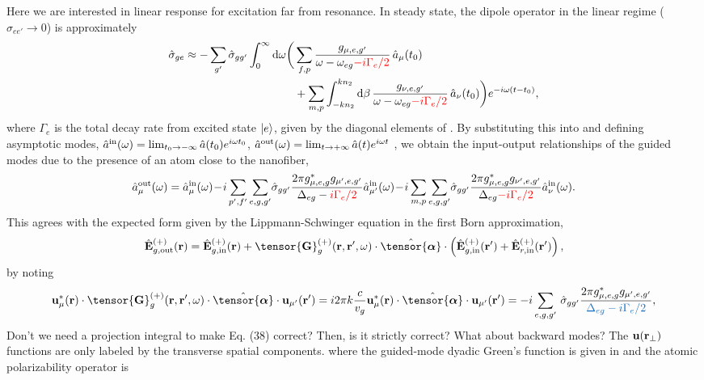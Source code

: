\documentclass[preprint,aps,pra,onecolumn]{revtex4-1} %
\newcommand{\inp}{{\rm in}}
\newcommand{\out}{{\rm out}}
\newcommand{\poltens}{\hat{\tensor{\boldsymbol{\alpha}}}}
\newcommand{\change}[1]{{\color{RoyalBlue} #1}}
\newcommand{\comment}[1]{{\color{Maroon} #1}}
\newcommand{\error}[1]{{\color{red} #1}}
\begin{document}
Here we are interested in linear response for excitation far from resonance.  In steady state, the dipole 
operator in the linear regime ($\hat{\sigma}_{ee'} \rightarrow 0 $) is approximately
\begin{align}
\hat{\sigma}_{ge} \approx -\sum_{g'} \hat{\sigma}_{gg'}\int_0^{\infty}\mathrm{d}\omega \bigg( & \sum_{f,p}  
\frac{g_{\mu, e,g'}}{\omega-\omega_{eg} \error{- i \Gamma_{e}/2 } }\, \hat{a}_\mu (t_0) \\
	&+\sum_{m,p} \int_{-kn_2}^{kn_2}\mathrm{d}\beta \, \frac{g_{\nu, e,g'}}{\omega-\omega_{eg}\error{- i \Gamma_{e}/2 }} \,\hat{a}_\nu (t_0)  \bigg)e^{-i\omega (t-t_0)} , \nn
\end{align}
where $\Gamma_e$ is the total decay rate from excited state $\lvert{e}\rangle$, given by the diagonal elements of .  By substituting this into  and defining asymptotic modes, \comment{ $\hat{a}^{\inp}(\omega) = \lim_{t_0\rightarrow -\infty} \hat{a}(t_0) e^{i\omega t_0}$, $\hat{a}^{\out}(\omega) = \lim_{t\rightarrow +\infty} \hat{a}(t) e^{i\omega t}$ \cite{fan_input-output_2010} }, we obtain the input-output relationships of the guided modes due to the presence of an atom close to the nanofiber,
\begin{equation}
\hat{a}^{\out}_\mu (\omega) = \hat{a}^{\inp}_\mu (\omega) \!-\! i\sum_{p',f'} 
\sum_{e,g,g'}\!\hat{\sigma}_{gg'}\frac{2\pi g_{\mu,e,g}^* 
g_{\mu',e,g'}}{ \Delta_{eg} -  \error{i \Gamma_{e}/2 }}\hat{a}^{\inp}_{\mu'}(\omega) \!-\! i\sum_{m,p} 
\sum_{e,g,g'}\!\hat{\sigma}_{gg'}\frac{2\pi  g_{\mu,e,g}^* 
g_{\nu',e,g'}}{ \Delta_{eg} \error{ - i \Gamma_{e}/2 }}\hat{a}^{\inp}_{\nu}(\omega).
\end{equation}
This agrees with the expected form given by the Lippmann-Schwinger equation in the first Born 
approximation,
\begin{equation} \label{Eq::IOScatteredField}
\hat{\mathbf{E}}^{(+)}_{g,\out}(\br)=\hat{\mathbf{E}}^{(+)}_{g, 
\inp}(\br)+\tensor{\mathbf{G}}_g^{(+)}(\br,\br',\omega)\cdot \poltens \cdot 
\left(\hat{\mathbf{E}}^{(+)}_{g, \inp}(\br')+\hat{\mathbf{E}}^{(+)}_{r, \inp}(\br')\right),
\end{equation}
by noting
\comment{
\begin{equation}
\mathbf{u}^*_{\mu} (\br)\cdot \tensor{\mathbf{G}}_g^{(+)}(\br,\br',\omega)\cdot 
\poltens \cdot \mathbf{u}_{\mu'} (\br') = i 2\pi k\frac{c}{v_g} \mathbf{u}^*_\mu 
 (\br) \cdot \poltens \cdot \mathbf{u}_{\mu'} (\br') = - i \sum_{e,g,g'}\!\ 
 \hat{\sigma}_{gg'} \frac{2\pi g_{\mu,e,g}^* g_{\mu',e,g'}}{\change{ \Delta_{eg} - i \Gamma_{e}/2 }}, 
\end{equation}
 Don't we need a projection integral to make Eq. (38) correct?  Then, is it strictly correct? What about backward modes? The $\mathbf{u}(\mathbf{r}_\perp)$ functions are only labeled by the transverse spatial components.} where the guided-mode dyadic Green's function is given in  and the atomic polarizability operator is
\end{document}

